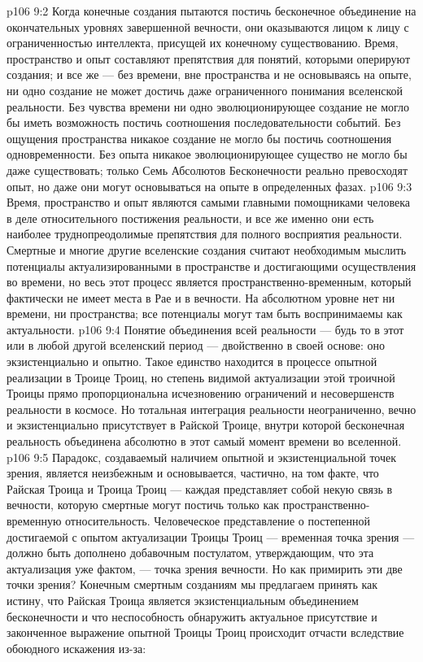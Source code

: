 \vs p106 9:2 Когда конечные создания пытаются постичь бесконечное объединение на окончательных уровнях завершенной вечности, они оказываются лицом к лицу с ограниченностью интеллекта, присущей их конечному существованию. Время, пространство и опыт составляют препятствия для понятий, которыми оперируют создания; и все же --- без времени, вне пространства и не основываясь на опыте, ни одно создание не может достичь даже ограниченного понимания вселенской реальности. Без чувства времени ни одно эволюционирующее создание не могло бы иметь возможность постичь соотношения последовательности событий. Без ощущения пространства никакое создание не могло бы постичь соотношения одновременности. Без опыта никакое эволюционирующее существо не могло бы даже существовать; только Семь Абсолютов Бесконечности реально превосходят опыт, но даже они могут основываться на опыте в определенных фазах.
\vs p106 9:3 Время, пространство и опыт являются самыми главными помощниками человека в деле относительного постижения реальности, и все же именно они есть наиболее труднопреодолимые препятствия для полного восприятия реальности. Смертные и многие другие вселенские создания считают необходимым мыслить потенциалы актуализированными в пространстве и достигающими осуществления во времени, но весь этот процесс является пространственно\hyp{}временным, который фактически не имеет места в Рае и в вечности. На абсолютном уровне нет ни времени, ни пространства; все потенциалы могут там быть воспринимаемы как актуальности.
\vs p106 9:4 Понятие объединения всей реальности --- будь то в этот или в любой другой вселенский период --- двойственно в своей основе: оно экзистенциально и опытно. Такое единство находится в процессе опытной реализации в Троице Троиц, но степень видимой актуализации этой троичной Троицы прямо пропорциональна исчезновению ограничений и несовершенств реальности в космосе. Но тотальная интеграция реальности неограниченно, вечно и экзистенциально присутствует в Райской Троице, внутри которой бесконечная реальность объединена абсолютно в этот самый момент времени во вселенной.
\vs p106 9:5 \pc Парадокс, создаваемый наличием опытной и экзистенциальной точек зрения, является неизбежным и основывается, частично, на том факте, что Райская Троица и Троица Троиц --- каждая представляет собой некую связь в вечности, которую смертные могут постичь только как пространственно\hyp{}временную относительность. Человеческое представление о постепенной достигаемой с опытом актуализации Троицы Троиц --- временная точка зрения --- должно быть дополнено добавочным постулатом, утверждающим, что эта актуализация уже  фактом, --- точка зрения вечности. Но как примирить эти две точки зрения? Конечным смертным созданиям мы предлагаем принять как истину, что Райская Троица является экзистенциальным объединением бесконечности и что неспособность обнаружить актуальное присутствие и законченное выражение опытной Троицы Троиц происходит отчасти вследствие обоюдного искажения из\hyp{}за:
